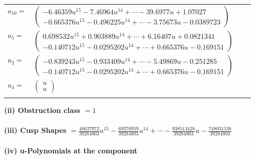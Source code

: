 \documentclass[1p]{elsarticle_modified}
\theoremstyle{definition}
\begin{document}
\begin{tabular}{m{7pt} m{180pt} m{7pt} m{180pt} }
\flushright $a_{10}=$&$\begin{pmatrix}-6.46359 u^{15}-7.46964 u^{14}+\cdots-39.6977 u+1.07027\\-0.665376 u^{15}-0.496225 u^{14}+\cdots-3.75673 u-0.0389723\end{pmatrix}$ \\
\flushright $a_{5}=$&$\begin{pmatrix}0.698532 u^{15}+0.903889 u^{14}+\cdots+6.16407 u+0.0821341\\-0.140712 u^{15}-0.0295202 u^{14}+\cdots+0.665376 u-0.169151\end{pmatrix}$ \\
\flushright $a_{2}=$&$\begin{pmatrix}-0.839243 u^{15}-0.933409 u^{14}+\cdots-5.49869 u-0.251285\\-0.140712 u^{15}-0.0295202 u^{14}+\cdots+0.665376 u-0.169151\end{pmatrix}$ \\
\flushright $a_{4}=$&$\begin{pmatrix}u\\u\end{pmatrix}$\\&\end{tabular}
\flushleft \textbf{(ii) Obstruction class $= 1$}\\~\\
\flushleft \textbf{(iii) Cusp Shapes $= \frac{48637972}{39284803} u^{15}-\frac{69376959}{39284803} u^{14}+\cdots-\frac{938513428}{39284803} u-\frac{748031538}{39284803}$}\\~\\
\newpage\renewcommand{\arraystretch}{1}
\flushleft \textbf{(iv) u-Polynomials at the component}\newline \\
\end{document}
